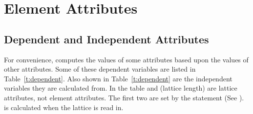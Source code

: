 \chapter {Element Attributes}
\label{c:attrib}

\section{Dependent and Independent Attributes} 
\label{s:depend} 

For convenience, \bmad computes the values of some attributes based
upon the values of other attributes. Some of these dependent variables are
listed in Table~\ref{t:dependent}. Also shown in
Table~\ref{t:dependent} are the independent variables they are
calculated from.  In the table  and  (lattice
length) are lattice attributes, not element attributes. The first two
are set by the  statement (See
).  is calculated when the lattice is read
in.

\begin{table}[ht]
\caption[Table of dependent variables.]{Partial listing of dependent variables and 
  the independent variables they are calculated from.}
\label{t:dependent}
\end{table}


